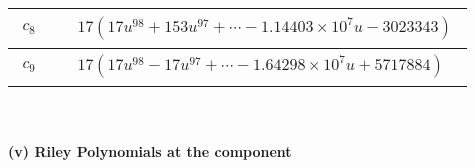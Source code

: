 \documentclass[1p]{elsarticle_modified}
\theoremstyle{definition}
\begin{document}
\begin{tabular}{m{50pt}|m{274pt}}
\hline $$\begin{aligned}c_{8}\end{aligned}$$&$\begin{aligned}
&17(17 u^{98}+153 u^{97}+\cdots-1.14403\times10^{7} u-3023343)
\end{aligned}$\\
\hline $$\begin{aligned}c_{9}\end{aligned}$$&$\begin{aligned}
&17(17 u^{98}-17 u^{97}+\cdots-1.64298\times10^{7} u+5717884)
\end{aligned}$\\
\hline
\end{tabular}\\~\\
\newpage\renewcommand{\arraystretch}{1}
\flushleft \textbf{(v) Riley Polynomials at the component}\newline \\
\end{document}
